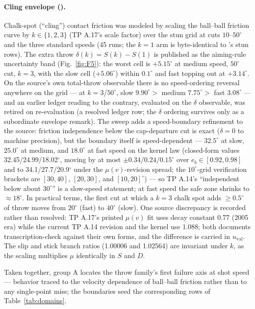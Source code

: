 \paragraph{Cling envelope ().}
Chalk-spot (``cling'') contact friction was modeled by scaling the
ball--ball friction curve by $k \in \{1, 2, 3\}$ (TP A.17's scale
factor) over the  stun grid at cuts $10$--$50^\circ$ and the
three standard speeds (45 runs; the $k = 1$ arm is byte-identical to
's stun rows). The extra throw $\delta(k) = S(k) - S(1)$ is
published as the aiming-rule uncertainty band (Fig.~\ref{fig:F5}): the
worst cell is $+5.15^\circ$ at medium speed, $50^\circ$ cut, $k = 3$,
with the slow cell ($+5.06^\circ$) within $0.1^\circ$ and fast topping
out at $+3.14^\circ$. On the source's own total-throw observable there
is no speed-ordering reversal anywhere on the grid --- at
$k = 3$/$50^\circ$, slow $9.90^\circ >$ medium $7.75^\circ >$ fast
$3.08^\circ$ --- and an earlier ledger reading to the contrary, evaluated
on the $\delta$ observable, was retired on re-evaluation (a resolved
ledger row; the $\delta$ ordering survives only as a subordinate
envelope remark). The sweep adds a
speed-boundary refinement to the source: friction independence below the
cap-departure cut is exact ($\delta = 0$ to machine precision), but the
boundary itself is speed-dependent --- $32.5^\circ$ at slow, $25.0^\circ$
at medium, and $18.0^\circ$ at fast speed on the kernel law (closed-form
values 32.45/24.99/18.02$^\circ$, moving by at most
$\pm 0.34/0.24/0.15^\circ$ over $e_b \in [0.92, 0.98]$ and to
34.1/27.7/20.9$^\circ$ under the $\mu(v)$-revision spread; the
$10^\circ$-grid verification brackets are $[30, 40]$, $[20, 30]$, and
$[10, 20]^\circ$) --- so TP
A.14's ``independent below about $30^\circ$'' is a slow-speed statement;
at fast speed the safe zone shrinks to $\approx 18^\circ$. In practical
terms, the first cut at which a $k = 3$ chalk spot adds $\ge 0.5^\circ$
of throw moves from $20^\circ$ (fast) to $40^\circ$ (slow). One source
discrepancy is recorded rather than resolved: TP A.17's printed
$\mu(v)$ fit uses decay constant 0.77 (2005 era) while the current TP
A.14 revision and the kernel use 1.088; both documents
transcription-check against their own forms, and the difference is
carried in $u_{\mathrm{val}}$.
The slip and stick branch ratios (1.00006 and 1.02564) are invariant
under $k$, as the scaling multiplies $\mu$ identically in $S$ and $D$.

Taken together, group A locates the throw family's first failure axis at
shot speed --- behavior traced to the velocity dependence of ball--ball
friction \citep{marlow1995physics,alciatore_tp_a14} rather than to any
single-point miss; the boundaries seed the corresponding rows of
Table~\ref{tab:domains}.

